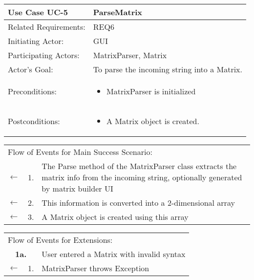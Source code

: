 \documentclass[11pt,letterpaper]{article}
\begin{document}
\newpage
\begin{center}
\begin{tabular}{p{1.5in}p{5in}}
\hline
\textbf{Use Case UC-5}     & \textbf{ParseMatrix} \\ \hline
Related Requirements: & REQ6 \\
Initiating Actor:     & GUI \\
Participating Actors: &MatrixParser, Matrix \\
Actor's Goal:          & To parse the incoming string into a Matrix. \\
Preconditions:         & \begin{itemize}[nosep]
		      \item  MatrixParser is initialized
                         \end{itemize} \\
Postconditions:        & \begin{itemize}[nosep]
                         \item A Matrix object is created.
                         \end{itemize} \\ \hline
\end{tabular}

\begin{tabular}{p{.25in}p{.25in}p{5.8in}}
\multicolumn{3}{l}{Flow of Events for Main Success Scenario:} \\
$\leftarrow$  & 1. & The Parse method of the MatrixParser class extracts the matrix info from the incoming string, optionally generated by matrix builder UI\\
$\leftarrow$  & 2. & This information is converted into a 2-dimensional array\\
$\leftarrow$ & 3.& A Matrix object is created using this array\\
\end{tabular}

\begin{tabular}{p{.25in}p{.25in}p{5.8in}}
\multicolumn{3}{l}{Flow of Events for Extensions:} \\
\multicolumn{2}{c}{\textbf{1a.}} & User entered a Matrix with invalid syntax \\
$\leftarrow$  & 1.           & MatrixParser throws Exception\\


\end{tabular}
\end{center}
\end{document}
